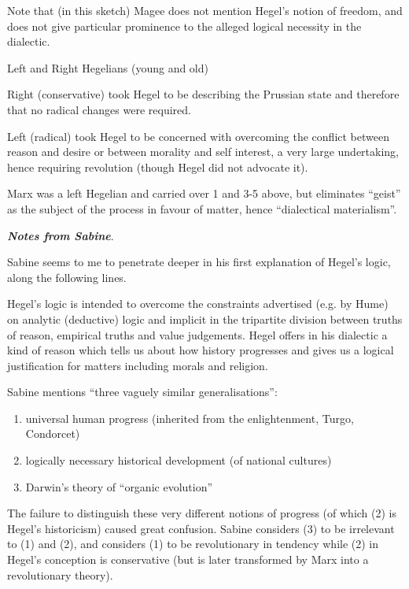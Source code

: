 \documentclass[10pt,titlepage]{book}
\begin{document}
Note that (in this sketch) Magee does not mention Hegel's notion of freedom, and does not give particular prominence to the alleged logical necessity in the dialectic. 

Left and Right Hegelians (young and old)

Right (conservative) took Hegel to be describing the Prussian state and therefore that no radical changes were required.

Left (radical) took Hegel to be concerned with overcoming the conflict between reason and desire or between morality and self interest, a very large undertaking, hence requiring revolution (though Hegel did not advocate it).

Marx was a left Hegelian and carried over 1 and 3-5 above, but eliminates ``geist'' as the subject of the process in favour of matter, hence ``dialectical materialism''.

{\bf\emph{Notes from Sabine}}.

Sabine \cite{sabine63} seems to me to penetrate deeper in his first explanation of Hegel's logic, along the following lines.

Hegel's logic is intended to overcome the constraints advertised (e.g. by Hume) on analytic (deductive) logic and implicit in the tripartite division between truths of reason, empirical truths and value judgements.
Hegel offers in his dialectic a kind of reason which tells us about how history progresses and gives us a logical justification for matters including morals and religion.

Sabine mentions ``three vaguely similar generalisations'':

\begin{enumerate}
\item universal human progress (inherited from the enlightenment, Turgo, Condorcet)
  
\item logically necessary historical development (of national cultures)
  
\item Darwin's theory of ``organic evolution''
\end{enumerate}

The failure to distinguish these very different notions of progress (of which (2) is Hegel's historicism) caused great confusion.
Sabine considers (3) to be irrelevant to (1) and (2), and considers (1) to be revolutionary in tendency while (2) in Hegel's conception is conservative (but is later transformed by Marx into a revolutionary theory).
\end{document}
